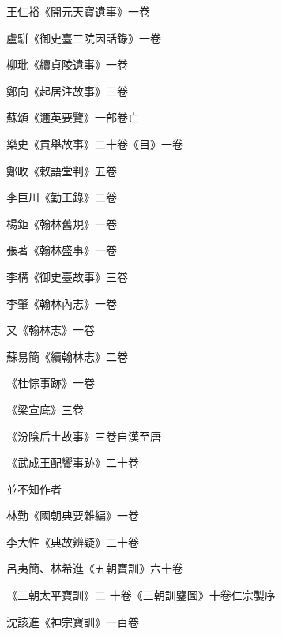 \begin{pinyinscope}
 王仁裕《開元天寶遺事》一卷



 盧駢《御史臺三院因話錄》一卷



 柳玭《續貞陵遺事》一卷



 鄭向《起居注故事》三卷



 蘇頌《邇英要覽》一部卷亡



 樂史《貢舉故事》二十卷《目》一卷



 鄭畋《敕語堂判》五卷



 李巨川《勤王錄》二卷



 楊鉅《翰林舊規》一卷



 張著《翰林盛事》一卷



 李構《御史臺故事》三卷



 李肇《翰林內志》一卷



 又《翰林志》一卷



 蘇易簡《續翰林志》二卷



 《杜悰事跡》一卷



 《梁宣底》三卷



 《汾陰后土故事》三卷自漢至唐



 《武成王配饗事跡》二十卷



 並不知作者



 林勤《國朝典要雜編》一卷



 李大性《典故辨疑》二十卷



 呂夷簡、林希進《五朝寶訓》六十卷



 《三朝太平寶訓》二
 十卷《三朝訓鑒圖》十卷仁宗製序



 沈該進《神宗寶訓》一百卷




\end{pinyinscope}
